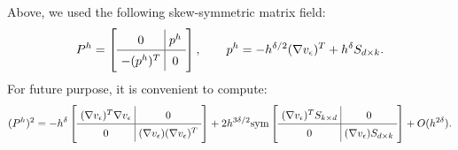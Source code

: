\documentclass[reqno,twoside,11pt]{amsart}
\newcommand{\sym}{\mathrm{sym}}
\numberwithin{equation}{section}
\theoremstyle{plain}
\theoremstyle{definition}
\begin{document}
Above, we used the following skew-symmetric matrix field:
$$\arraycolsep=3.4pt\def\arraystretch{1.4} 
P^h = \left[\begin{array}{c|c} 0 & p^h \\ \hline -(p^h)^T & 0\end{array}\right],
\qquad p^h= - h^{\delta/2} (\nabla v_\epsilon)^T+h^\delta S_{d\times k}. $$
For future purpose, it is convenient to compute:
$$ \arraycolsep=3.4pt\def\arraystretch{1.4}
(P^h)^2 = - h^\delta\left[\begin{array}{c|c} (\nabla v_\epsilon)^T\nabla v_\epsilon
& 0 \\ \hline 0 & (\nabla v_\epsilon)(\nabla v_\epsilon)^T \end{array}\right] 
+ 2h^{3\delta/2}\sym \left[\begin{array}{c|c} (\nabla v_\epsilon)^TS_{k\times d} & 0 \\ \hline
0 & (\nabla v_\epsilon)S_{d\times k}\end{array}\right] 
+ O(h^{2\delta}).$$

\medskip
\end{document}
